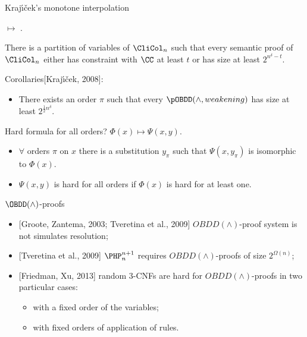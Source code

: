 \begin{frame}{Kraj{\'{\i}}{\v{c}}ek's monotone interpolation}

     $\mapsto$
    .

    \pause

    \begin{theorem}[Kraj{\'{\i}}{\v{c}}ek, 1998]
        There is a partition of variables of $\CliCol_n$ such that every semantic proof of $\CliCol_n$
        either has constraint with $\CC$ at least $t$ or has size at least $2^{n^{\delta} - t}$. 
    \end{theorem}

    \pause

    Corollaries[Kraj{\'{\i}}{\v{c}}ek, 2008]:
    \begin{itemize}
        \item There exists an order $\pi$ such that every $\pOBDD(\land,
            weakening)$ has size at least $2^{\frac{1}{2} n^\delta}$.
    \end{itemize}

    \pause
    Hard formula for all orders? \pause $\Phi(x) \mapsto \Psi(x, y)$.
    
    \begin{itemize}
        \item $\forall$ orders $\pi$ on $x$ there is a substitution $y_{\pi}$ such that $\Psi(x,
            y_{\pi})$ is isomorphic to $\Phi(x)$.
        \item $\Psi(x, y)$ is hard for all orders if $\Phi(x)$ is hard for at least one.
    \end{itemize}
\end{frame}

\begin{frame}{$\OBDD(\land)$-proofs}
    \begin{itemize}
        \item{} [Groote, Zantema, 2003; Tveretina et al., 2009] $OBDD(\land)$-proof system is
            not simulates resolution;
        \item{} [Tveretina et al., 2009] $\PHP^{n + 1}_n$ requires $OBDD(\land)$-proofs of size
            $2^{\Omega(n)}$;
        \item{} [Friedman, Xu, 2013] random $3$-CNFs are hard for $OBDD(\land)$-proofs in two particular
            cases:
            \begin{itemize}
                \item with a fixed order of the variables;
                \item with fixed orders of application of rules.
            \end{itemize}
    \end{itemize}    
\end{frame}


